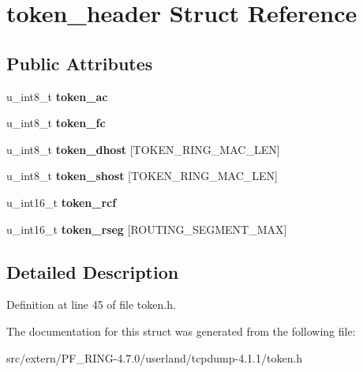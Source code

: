 \hypertarget{structtoken__header}{
\section{token\_\-header Struct Reference}
\label{structtoken__header}
}
\subsection*{Public Attributes}
\begin{DoxyCompactItemize}
\item 
\hypertarget{structtoken__header_a229491c4921c5bc3079401aebe3d3022}{
u\_\-int8\_\-t {\bfseries token\_\-ac}}
\label{structtoken__header_a229491c4921c5bc3079401aebe3d3022}

\item 
\hypertarget{structtoken__header_ac86a253c6076870132d6a342711460cc}{
u\_\-int8\_\-t {\bfseries token\_\-fc}}
\label{structtoken__header_ac86a253c6076870132d6a342711460cc}

\item 
\hypertarget{structtoken__header_a02c70becc05e6e3faf28e188dc1d123d}{
u\_\-int8\_\-t {\bfseries token\_\-dhost} \mbox{[}TOKEN\_\-RING\_\-MAC\_\-LEN\mbox{]}}
\label{structtoken__header_a02c70becc05e6e3faf28e188dc1d123d}

\item 
\hypertarget{structtoken__header_a17667d2e0f68ccea470c191ff8ef1c7f}{
u\_\-int8\_\-t {\bfseries token\_\-shost} \mbox{[}TOKEN\_\-RING\_\-MAC\_\-LEN\mbox{]}}
\label{structtoken__header_a17667d2e0f68ccea470c191ff8ef1c7f}

\item 
\hypertarget{structtoken__header_a73e499590ed81f2a69e00f8f351ee1ba}{
u\_\-int16\_\-t {\bfseries token\_\-rcf}}
\label{structtoken__header_a73e499590ed81f2a69e00f8f351ee1ba}

\item 
\hypertarget{structtoken__header_ad8d0603b071a289924d941be6b917d6c}{
u\_\-int16\_\-t {\bfseries token\_\-rseg} \mbox{[}ROUTING\_\-SEGMENT\_\-MAX\mbox{]}}
\label{structtoken__header_ad8d0603b071a289924d941be6b917d6c}

\end{DoxyCompactItemize}


\subsection{Detailed Description}


Definition at line 45 of file token.h.



The documentation for this struct was generated from the following file:\begin{DoxyCompactItemize}
\item 
src/extern/PF\_\-RING-\/4.7.0/userland/tcpdump-\/4.1.1/token.h\end{DoxyCompactItemize}
